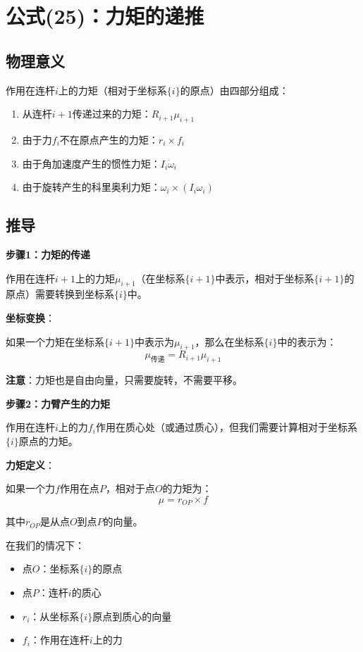 \documentclass[12pt,a4paper]{article}
\begin{document}
\section{公式(25)：力矩的递推}

\subsection{物理意义}

作用在连杆$i$上的力矩（相对于坐标系$\{i\}$的原点）由四部分组成：
\begin{enumerate}
\item 从连杆$i+1$传递过来的力矩：$R_{i+1} \mu_{i+1}$
\item 由于力$f_i$不在原点产生的力矩：$r_i \times f_i$
\item 由于角加速度产生的惯性力矩：$I_i \dot{\omega}_i$
\item 由于旋转产生的科里奥利力矩：$\omega_i \times (I_i \omega_i)$
\end{enumerate}

\subsection{推导}

\textbf{步骤1：力矩的传递}

作用在连杆$i+1$上的力矩$\mu_{i+1}$（在坐标系$\{i+1\}$中表示，相对于坐标系$\{i+1\}$的原点）需要转换到坐标系$\{i\}$中。

\textbf{坐标变换}：

如果一个力矩在坐标系$\{i+1\}$中表示为$\mu_{i+1}$，那么在坐标系$\{i\}$中的表示为：
\begin{equation}
\mu_{\text{传递}} = R_{i+1} \mu_{i+1}
\end{equation}

\textbf{注意}：力矩也是自由向量，只需要旋转，不需要平移。

\textbf{步骤2：力臂产生的力矩}

作用在连杆$i$上的力$f_i$作用在质心处（或通过质心），但我们需要计算相对于坐标系$\{i\}$原点的力矩。

\textbf{力矩定义}：

如果一个力$f$作用在点$P$，相对于点$O$的力矩为：
\begin{equation}
\mu = r_{OP} \times f
\end{equation}

其中$r_{OP}$是从点$O$到点$P$的向量。

在我们的情况下：
\begin{itemize}
\item 点$O$：坐标系$\{i\}$的原点
\item 点$P$：连杆$i$的质心
\item $r_i$：从坐标系$\{i\}$原点到质心的向量
\item $f_i$：作用在连杆$i$上的力
\end{itemize}
\end{document}
